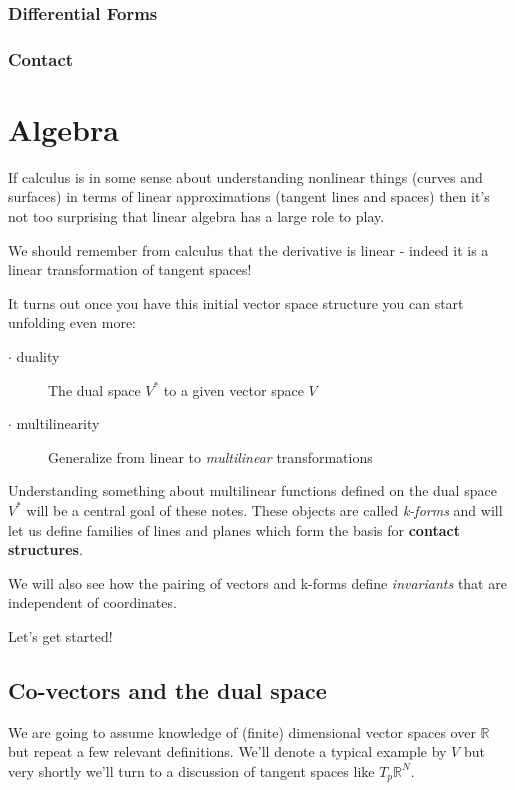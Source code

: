 \documentclass{article}
\begin{document}
\subsubsection {Differential Forms}

\subsubsection {Contact}

\section {Algebra}

If calculus is in some sense about understanding nonlinear things (curves and
surfaces) in terms of linear approximations (tangent lines and spaces) then it's
not too surprising that linear algebra has a large role to play.

We should remember from calculus that the derivative is linear - indeed it is a
linear transformation of tangent spaces!

It turns out once you have this initial vector space structure you can start
unfolding even more:

\begin{description}
\item[$\cdot$ duality       ] The dual space $V^{*}$ to a given vector space $V$
\item[$\cdot$ multilinearity] Generalize from linear to \textsl{multilinear} transformations 
\end{description}

Understanding something about multilinear functions defined on the dual space
$V^{*}$ will be a central goal of these notes. These objects are called
\textsl{k-forms} and will let us define families of lines and planes which form
the basis for \textbf{contact structures}.

We will also see how the pairing of vectors and k-forms define
\textsl{invariants} that are independent of coordinates.

Let's get started!

\subsection {Co-vectors and the dual space}

We are going to assume knowledge of (finite) dimensional vector spaces over
$\mathbb{R}$ but repeat a few relevant definitions. We'll
denote a typical example by $V$ but very shortly we'll turn to a discussion of
tangent spaces like $T_{p}\mathbb{R}^{N}$.
\end{document}
